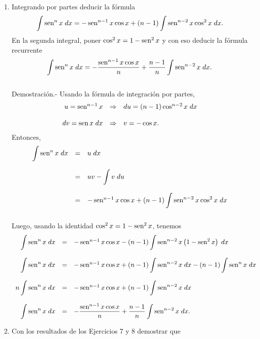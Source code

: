 \begin{enumerate}[\bfseries 1.]
	\item Integrando por partes deducir la fórmula
	$$\int \sen^n x\; dx = -\sen^{n-1}x\cos x + (n-1)\int \sen^{n-2}x\cos^2 x\; dx.$$
	En la segunda integral, poner $\cos^2 x= 1-\sen^2 x$ y con eso deducir la fórmula recurrente
	$$\int \sen^n x\; dx = -\dfrac{\sen^{n-1}x\cos x}{n}+\dfrac{n-1}{n}\int \sen^{n-2}x\; dx.$$\\
	    Demostración.-\; Usando la fórmula de integración por partes,
	    $$\begin{array}{rcl}
		u=\sen^{n-1} x &\Rightarrow& du=(n-1)\cos^{n-2} x\; dx\\\\
		dv=\sen x\; dx &\Rightarrow& v=-\cos x.
	    \end{array}$$
	    Entonces, 
	    $$\begin{array}{rcl}
		\displaystyle\int \sen^n x\; dx &=&u\; dx\\\\
						&=&uv- \displaystyle\int v\; du\\\\
						&=& -\sen^{n-1}x\cos x + (n-1)\displaystyle\int \sen^{n-2}x\cos^2 x\; dx\\\\
	    \end{array}$$
	    Luego, usando la identidad $\cos^2x=1-\sen^2 x$, tenemos
	    $$\begin{array}{rcl}
		\displaystyle\int \sen^n x\; dx &=& -\sen^{n-1}x\cos x - (n-1)\displaystyle\int \sen^{n-2}x\left(1-\sen^2 x\right)\; dx\\\\
		\displaystyle\int \sen^n x\; dx &=& -\sen^{n-1}x\cos x + (n-1)\displaystyle\int \sen^{n-2}x\; dx - (n-1)\displaystyle\int \sen^{n}x\; dx\\\\
		n\displaystyle\int \sen^n x\; dx &=& -\sen^{n-1}x\cos x + (n-1)\displaystyle\int \sen^{n-2}x\; dx\\\\
		\displaystyle\int \sen^n x\; dx &=& -\dfrac{\sen^{n-1}x\cos x}{n}+\dfrac{n-1}{n}\displaystyle\int \sen^{n-2}x\; dx.
	    \end{array}$$
	    \vspace{0.5cm}

	\item Con los resultados de los Ejercicios 7 y 8 demostrar que
	    \begin{enumerate}[(a)]


\end{enumerate}
\end{enumerate}
